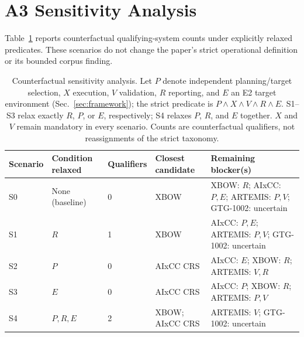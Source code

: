 \documentclass[conference,compsoc]{IEEEtran}
\begin{document}
\section{A3 Sensitivity Analysis}
\label{app:sensitivity}
Table~\ref{tab:sensitivity} reports counterfactual qualifying-system counts under explicitly
relaxed predicates. These scenarios do not change the paper's strict operational definition or
its bounded corpus finding.

\begin{table}[t]
\centering
\caption{Counterfactual sensitivity analysis. Let $P$ denote independent planning/target
selection, $X$ execution, $V$ validation, $R$ reporting, and $E$ an E2 target environment
(Sec.~\ref{sec:framework}); the strict predicate is $P\land X\land V\land R\land E$.
S1--S3 relax exactly $R$, $P$, or $E$, respectively; S4 relaxes $P$, $R$, and $E$ together.
$X$ and $V$ remain mandatory in every scenario. Counts are counterfactual qualifiers, not
reassignments of the strict taxonomy.}
\label{tab:sensitivity}
\scriptsize
\begin{tabular}{lllll}
\hline
Scenario & Condition relaxed & Qualifiers & Closest candidate & Remaining blocker(s) \\
\hline
S0 & None (baseline) & 0 & XBOW & XBOW: $R$; AIxCC: $P,E$;
ARTEMIS: $P,V$; GTG-1002: uncertain \\
S1 & $R$ & 1 & XBOW & AIxCC: $P,E$; ARTEMIS: $P,V$; GTG-1002: uncertain \\
S2 & $P$ & 0 & AIxCC CRS & AIxCC: $E$; XBOW: $R$; ARTEMIS: $V,R$ \\
S3 & $E$ & 0 & AIxCC CRS & AIxCC: $P$; XBOW: $R$; ARTEMIS: $P,V$ \\
S4 & $P,R,E$ & 2 & XBOW; AIxCC CRS & ARTEMIS: $V$; GTG-1002: uncertain \\
\hline
\end{tabular}
\end{table}
\end{document}
